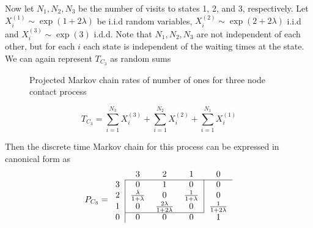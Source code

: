 \documentclass{article}
\theoremstyle{plain}
\theoremstyle{definition}
\theoremstyle{remark}
\numberwithin{equation}{section}
\begin{document}
Now let $N_1, N_2, N_3$ be the number of visits to states 1, 2, and 3, respectively.
Let $X_i^{(1)} \sim \exp(1 + 2\lambda)$ be i.i.d random variables, $X_i^{(2)} \sim \exp(2 + 2\lambda)$ i.i.d and $X_i^{(3)} \sim \exp(3)$ i.d.d.
Note that $N_1, N_2, N_3$ are not independent of each other, but for each $i$ each state is independent of the waiting times at the state.
We can again represent $T_{C_3}$ as random sums

\begin{figure}[h]
    \centering
    \caption{Projected Markov chain rates of number of ones for three node contact process}
    \label{fig:mc_three_contact}
\end{figure}

\begin{equation}
    T_{C_3} = \sum_{i = 1}^{N_3} X_i^{(3)} + \sum_{i = 1}^{N_2} X_i^{(2)} + \sum_{i = 1}^{N_1} X_i^{(1)}
\end{equation}

Then the discrete time Markov chain for this process can be expressed in canonical form as
$$
P_{C_3} = \begin{blockarray}{ccccc}
    & 3 & 2 & 1 & 0\\
    \begin{block}{c|ccc|c}
    \cline{2-5}
        3 & 0 & 1 & 0 & 0 \\
        2 & \frac{\lambda}{1 + \lambda} & 0 &
        \frac{1}{1 + \lambda} & 0\\
        1 & 0 & \frac{2\lambda}{1 + 2 \lambda} & 0 & \frac{1}{1 + 2\lambda}\\
    \cline{2-4}
    \end{block}
    \begin{block}{c|cccc}
    0 & 0 & 0 & 0 & 1\\
    \end{block}
\end{blockarray}
$$
\end{document}
